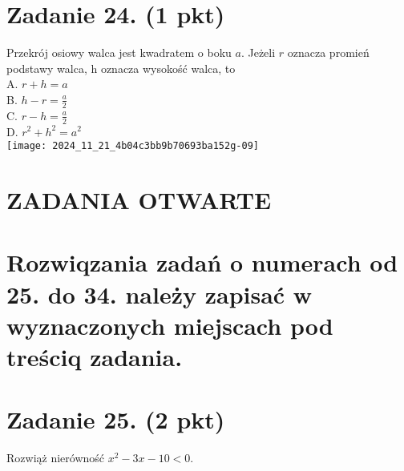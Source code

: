 \documentclass[10pt]{article}
\begin{document}
\section*{Zadanie 24. (1 pkt)}
Przekrój osiowy walca jest kwadratem o boku \(a\). Jeżeli \(r\) oznacza promień podstawy walca, h oznacza wysokość walca, to\\
A. \(r+h=a\)\\
B. \(h-r=\frac{a}{2}\)\\
C. \(r-h=\frac{a}{2}\)\\
D. \(r^{2}+h^{2}=a^{2}\)\\
\texttt{[image: 2024\_11\_21\_4b04c3bb9b70693ba152g-09]}

\section*{ZADANIA OTWARTE}
\section*{Rozwiqzania zadań o numerach od 25. do 34. należy zapisać w wyznaczonych miejscach pod treściq zadania.}
\section*{Zadanie 25. (2 pkt)}
Rozwiąż nierówność \(x^{2}-3 x-10<0\).
\end{document}
